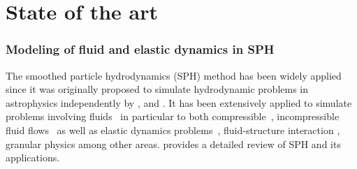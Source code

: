 

\section{State of the art}

\subsubsection*{Modeling of fluid and elastic dynamics in SPH}

The smoothed particle hydrodynamics (SPH) method has been widely applied since
it was originally proposed to simulate hydrodynamic problems in astrophysics
independently by \citet{lucy77}, and \citet{monaghan-gingold-stars-mnras-77}. It
has been extensively applied to simulate problems involving
fluids~\citep{dalrymple2001sph,shao2003incompressible} in particular to both
compressible~\citep{monaghan-review:2005}, incompressible fluid
flows~\citep{sph:fsf:monaghan-jcp94,sph:psph:cummins-rudman:jcp:1999} as well as
elastic dynamics problems~\citep{randles-1996,gray-ed-2001}, fluid-structure
interaction \citep{khayyer2018enhanced,he2017coupled}, granular physics
\citep{bui2008lagrangian,bui2021smoothed} among other areas.
\cite{monaghan2012smoothed} provides a detailed review of SPH and its
applications.






